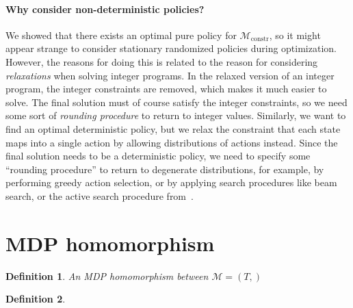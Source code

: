 \documentclass[11pt,a4paper]{article}
\newtheorem{define}{Definition}[section]
\theoremstyle{remark}
\begin{document}
\paragraph{Why consider non-deterministic policies?}
%
We showed that there exists an optimal pure policy for
$\mathcal{M}_\mathrm{constr}$, so it might appear strange to consider stationary
randomized policies during optimization.
%
However, the reasons for doing this is related to the reason for considering \emph{relaxations}
when solving integer programs. In the relaxed version of an integer program, the
integer constraints are removed, which makes it much easier to solve. The final
solution must of course satisfy the integer constraints, so we need some sort of
\emph{rounding procedure} to return to integer values.
%
Similarly, we want to find an optimal deterministic policy, but we relax the
constraint that each state maps into a single action by allowing distributions
of actions instead.
%
Since the final solution needs to be a deterministic policy, we need to specify
some ``rounding procedure'' to return to degenerate distributions, for example,
by performing greedy action selection, or by applying search procedures like
beam search, or the active search procedure
from~\cite{belloNeuralCombinatorialOptimization2017}.

\clearpage

\section{MDP homomorphism}

\begin{define}
  An MDP homomorphism between $\mathcal{M} = (T, )$
\end{define}

\begin{define}
\end{define}


\clearpage


\end{document}
